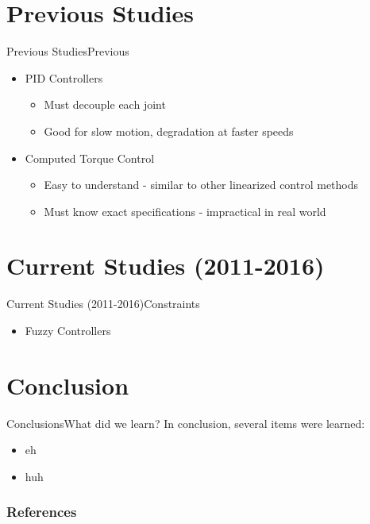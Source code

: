 \documentclass{beamer}
\begin{document}
\section[Previous]{Previous Studies}
\begin{frame}{Previous Studies}{Previous}
\begin{itemize}
	\item PID Controllers \cite{SONG2005208}
		\begin{itemize}
			\item Must decouple each joint
			\item Good for slow motion, degradation at faster speeds
		\end{itemize}
	\item Computed Torque Control \cite{SONG2005208}
		\begin{itemize}
			\item Easy to understand - similar to other linearized control methods 
			\item Must know exact specifications - impractical in real world
		\end{itemize}
\end{itemize}
\end{frame}

\section[Current]{Current Studies (2011-2016)}

\begin{frame}{Current Studies (2011-2016)}{Constraints}
\begin{itemize}
	\item Fuzzy Controllers \cite{SONG2005208}
\end{itemize}

\end{frame}




\section[Conclusion]{Conclusion}

\begin{frame}{Conclusions}{What did we learn?}
In conclusion, several items were learned:
\begin{itemize}
	\item eh
	\item huh
\end{itemize}
\end{frame}

\begin{frame}[allowframebreaks]
        \frametitle{References}
        
        
\end{frame}
\end{document}
